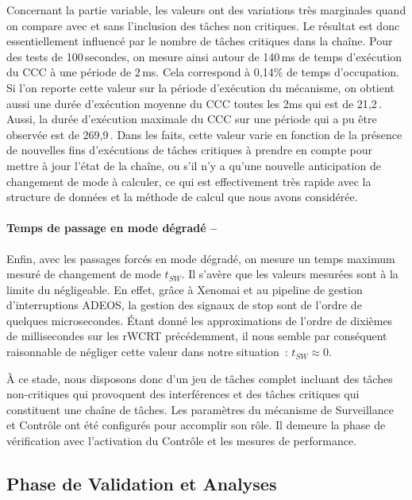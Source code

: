 \documentclass[french, a4paper, 11pt, twoside, pdftex]{StyleThese}
\begin{document}
Concernant la partie variable, les valeurs ont des variations très marginales quand on compare avec et sans l'inclusion des tâches non critiques. Le résultat est donc essentiellement influencé par le nombre de tâches critiques dans la chaîne. Pour des tests de 100\,secondes, on mesure ainsi autour de 140\,ms de temps d'exécution du CCC à une période de 2\,ms. Cela correspond à 0,14\% de temps d'occupation. Si l'on reporte cette valeur sur la période d'exécution du mécanisme, on obtient aussi une durée d'exécution moyenne du CCC toutes les 2ms qui est de 21,2\,. Aussi, la durée d'exécution maximale du CCC sur une période qui a pu être observée est de 269,9\,. Dans les faits, cette valeur varie en fonction de la présence de nouvelles fins d'exécutions de tâches critiques à prendre en compte pour mettre à jour l'état de la chaîne, ou s'il n'y a qu'une nouvelle anticipation de changement de mode à calculer, ce qui est effectivement très rapide avec la structure de données et la méthode de calcul que nous avons considérée.

\paragraph{Temps de passage en mode dégradé -- }Enfin, avec les passages forcés en mode dégradé, on mesure un temps maximum mesuré de changement de mode $t_{SW}$. Il s'avère que les valeurs mesurées sont à la limite du négligeable. En effet, grâce à Xenomai et au pipeline de gestion d'interruptions ADEOS, la gestion des signaux de stop sont de l'ordre de quelques microsecondes. Étant donné les approximations de l'ordre de dixièmes de millisecondes sur les rWCRT précédemment, il nous semble par conséquent raisonnable de négliger cette valeur dans notre situation~: $t_{SW} \approx 0$. 

À ce stade, nous disposons donc d'un jeu de tâches complet incluant des tâches non-critiques qui provoquent des interférences et des tâches critiques qui constituent une chaîne de tâches. Les paramètres du mécanisme de Surveillance et Contrôle ont été configurés pour accomplir son rôle. Il demeure la phase de vérification avec l'activation du Contrôle et les mesures de performance. 



\subsection{Phase de Validation et Analyses}
\end{document}
